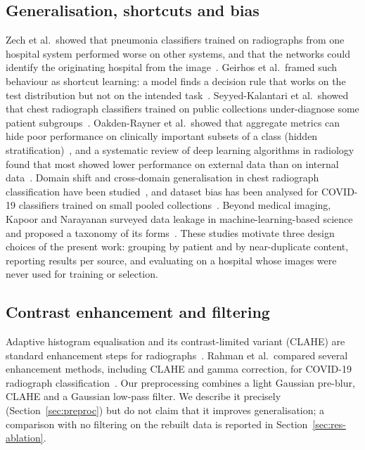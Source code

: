 \subsection{Generalisation, shortcuts and bias}
Zech et al.\ showed that pneumonia classifiers trained on radiographs from one hospital system performed worse on other systems, and that the networks could identify the originating hospital from the image~\cite{zech2018variable}. Geirhos et al.\ framed such behaviour as shortcut learning: a model finds a decision rule that works on the test distribution but not on the intended task~\cite{geirhos2020shortcut}. Seyyed-Kalantari et al.\ showed that chest radiograph classifiers trained on public collections under-diagnose some patient subgroups~\cite{seyyedkalantari2021underdiagnosis}. Oakden-Rayner et al.\ showed that aggregate metrics can hide poor performance on clinically important subsets of a class (hidden stratification)~\cite{oakdenrayner2020hidden}, and a systematic review of deep learning algorithms in radiology found that most showed lower performance on external data than on internal data~\cite{yu2022external}. Domain shift and cross-domain generalisation in chest radiograph classification have been studied~\cite{pooch2020can,cohen2020limits}, and dataset bias has been analysed for COVID-19 classifiers trained on small pooled collections~\cite{tartaglione2020unveiling}. Beyond medical imaging, Kapoor and Narayanan surveyed data leakage in machine-learning-based science and proposed a taxonomy of its forms~\cite{kapoor2023leakage}. These studies motivate three design choices of the present work: grouping by patient and by near-duplicate content, reporting results per source, and evaluating on a hospital whose images were never used for training or selection.

\subsection{Contrast enhancement and filtering}
Adaptive histogram equalisation and its contrast-limited variant (CLAHE) are standard enhancement steps for radiographs~\cite{pizer1987adaptive,zuiderveld1994contrast}. Rahman et al.\ compared several enhancement methods, including CLAHE and gamma correction, for COVID-19 radiograph classification~\cite{rahman2021exploring}. Our preprocessing combines a light Gaussian pre-blur, CLAHE and a Gaussian low-pass filter. We describe it precisely (Section~\ref{sec:preproc}) but do not claim that it improves generalisation; a comparison with no filtering on the rebuilt data is reported in Section~\ref{sec:res-ablation}.

